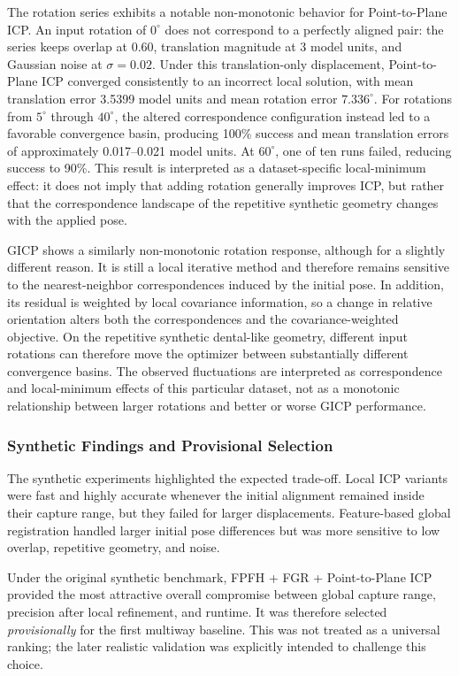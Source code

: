 The rotation series exhibits a notable non-monotonic behavior for Point-to-Plane ICP. An input rotation of $0^\circ$ does not correspond to a perfectly aligned pair: the series keeps overlap at 0.60, translation magnitude at 3 model units, and Gaussian noise at $\sigma=0.02$. Under this translation-only displacement, Point-to-Plane ICP converged consistently to an incorrect local solution, with mean translation error 3.5399 model units and mean rotation error $7.336^\circ$. For rotations from $5^\circ$ through $40^\circ$, the altered correspondence configuration instead led to a favorable convergence basin, producing 100\% success and mean translation errors of approximately 0.017--0.021 model units. At $60^\circ$, one of ten runs failed, reducing success to 90\%. This result is interpreted as a dataset-specific local-minimum effect: it does not imply that adding rotation generally improves ICP, but rather that the correspondence landscape of the repetitive synthetic geometry changes with the applied pose.


GICP shows a similarly non-monotonic rotation response, although for a slightly different reason. It is still a local iterative method and therefore remains sensitive to the nearest-neighbor correspondences induced by the initial pose. In addition, its residual is weighted by local covariance information, so a change in relative orientation alters both the correspondences and the covariance-weighted objective. On the repetitive synthetic dental-like geometry, different input rotations can therefore move the optimizer between substantially different convergence basins. The observed fluctuations are interpreted as correspondence and local-minimum effects of this particular dataset, not as a monotonic relationship between larger rotations and better or worse GICP performance.

\subsubsection{Synthetic Findings and Provisional Selection}

The synthetic experiments highlighted the expected trade-off. Local ICP variants were fast and highly accurate whenever the initial alignment remained inside their capture range, but they failed for larger displacements. Feature-based global registration handled larger initial pose differences but was more sensitive to low overlap, repetitive geometry, and noise.

Under the original synthetic benchmark, FPFH + FGR + Point-to-Plane ICP provided the most attractive overall compromise between global capture range, precision after local refinement, and runtime. It was therefore selected \emph{provisionally} for the first multiway baseline. This was not treated as a universal ranking; the later realistic validation was explicitly intended to challenge this choice.

